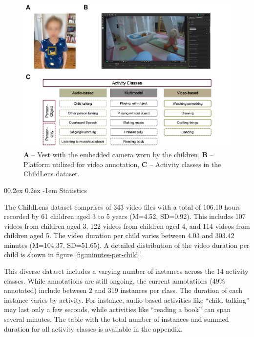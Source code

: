 \documentclass[
  man,floatsintext]{apa6}
\makeatletter
\let\oldparagraph\paragraph
\renewcommand{\paragraph}{
    \@ifstar
      \xxxParagraphStar
      \xxxParagraphNoStar
  }
\newcommand{\xxxParagraphStar}[1]{\oldparagraph*{#1}\mbox{}}
\newcommand{\xxxParagraphNoStar}[1]{\oldparagraph{#1}\mbox{}}
\renewcommand{\paragraph}{\@startsection{paragraph}{4}{\parindent}%
  {0\baselineskip \@plus 0.2ex \@minus 0.2ex}%
  {-1em}%
  {\normalfont\normalsize\bfseries\itshape\typesectitle}}
\makeatother
\begin{document}
\begin{figure}

{\centering \includegraphics{ChildLens_paper_files/figure-latex/camera-superannotate-activity-classes-1} 

}

\caption{\textbf{A} – Vest with the embedded camera worn by the children, \textbf{B} – Platform utilized for video annotation, \textbf{C} – Activity classes in the ChildLens dataset.}\label{fig:camera-superannotate-activity-classes}
\end{figure}

\paragraph{Statistics}\label{statistics}

The ChildLens dataset comprises of 343 video files with a total of 106.10 hours recorded by 61 children aged 3 to 5 years (M=4.52, SD=0.92). This includes 107 videos from children aged 3, 122 videos from children aged 4, and 114 videos from children aged 5. The video duration per child varies between 4.03 and 303.42 minutes (M=104.37, SD=51.65). A detailed distribution of the video duration per child is shown in figure \ref{fig:minutes-per-child}.

This diverse dataset includes a varying number of instances across the 14 activity classes. While annotations are still ongoing, the current annotations (49\% annotated) include between 2 and 319 instances per class. The duration of each instance varies by activity. For instance, audio-based activities like ``child talking'' may last only a few seconds, while activities like ``reading a book'' can span several minutes. The table with the total number of instances and summed duration for all activity classes is available in the appendix.
\end{document}
